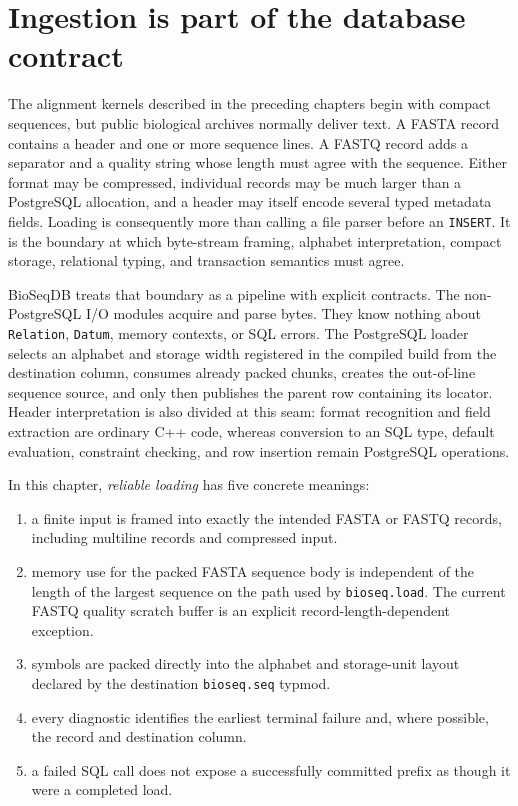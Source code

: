 \section{Ingestion is part of the database contract}
\label{sec:io-loading-contract}

The alignment kernels described in the preceding chapters begin with compact
sequences, but public biological archives normally deliver text.  A FASTA
record contains a header and one or more sequence lines. A FASTQ record adds a
separator and a quality string whose length must agree with the sequence.
Either format may be compressed, individual records may be much larger than a
PostgreSQL allocation, and a header may itself encode several typed metadata
fields.  Loading is consequently more than calling a file parser before an
\texttt{INSERT}.  It is the boundary at which byte-stream framing, alphabet
interpretation, compact storage, relational typing, and transaction semantics
must agree.

BioSeqDB treats that boundary as a pipeline with explicit contracts.  The
non-PostgreSQL I/O modules acquire and parse bytes.  They know nothing about
\texttt{Relation}, \texttt{Datum}, memory contexts, or SQL errors.  The
PostgreSQL loader selects an alphabet and storage width registered in the
compiled build from the destination column, consumes already packed chunks,
creates the out-of-line sequence source, and only then publishes the parent
row containing its locator.
Header interpretation is also divided at this seam: format recognition and
field extraction are ordinary C++ code, whereas conversion to an SQL type,
default evaluation, constraint checking, and row insertion remain PostgreSQL
operations.

In this chapter, \emph{reliable loading} has five concrete meanings:

\begin{enumerate}
    \item a finite input is framed into exactly the intended FASTA or FASTQ
    records, including multiline records and compressed input.
    \item memory use for the packed FASTA sequence body is independent of the
    length of the largest sequence on the path used by \texttt{bioseq.load}.
    The current FASTQ quality scratch buffer is an explicit
    record-length-dependent exception.
    \item symbols are packed directly into the alphabet and storage-unit layout
    declared by the destination \texttt{bioseq.seq} typmod.
    \item every diagnostic identifies the earliest terminal failure and, where
    possible, the record and destination column.
    \item a failed SQL call does not expose a successfully committed prefix as
    though it were a completed load.
\end{enumerate}

